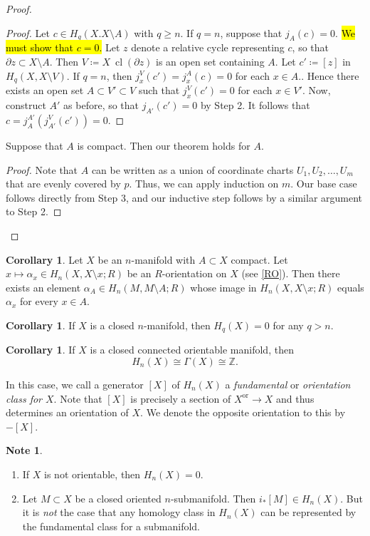 \documentclass[10pt,letterpaper,cm]{nupset}
\theoremstyle{definition}
\newtheorem{note}[definition]{Note}
\theoremstyle{theorem}
\newtheorem{corollary}[definition]{Corollary}
\theoremstyle{remark}
\newcommand{\Z}{\mathbb Z}
\newcommand{\1}{\mathbb{1}}
\newcommand{\0}{\vec 0}
\DeclareMathOperator{\cl}{cl}
\begin{document}
\begin{proof}
\begin{steps}
\begin{proof}
Let $c\in H_q(X. X\setminus A)$ with $q\geq n$. If $q=n$, suppose that $j_A(c) =0$. \hl{We must show that $c=0$.} Let $z$ denote a relative cycle representing $c$, so that $\partial{z} \subset X\setminus A$. Then $V\coloneqq  X\ \cl\left(\partial{z}\right)$ is an open set containing $A$. Let $c' \coloneqq  [z]$ in $H_q(X, X \setminus V)$.  If $q=n$, then $j_x^V(c') = j_x^A(c) =0$ for each $x\in A$.. Hence there exists an open set $A\subset V'\subset V$ such that $j_x^V(c') =0$ for each $x\in V'$.  Now, construct $A'$ as before, so that $j_{A'}(c') =0$ by Step 2. It follows that $c = j_A^{A'}(j_{A'}^V(c'))=0$.
\end{proof}
\item Suppose that $A$ is compact. Then our theorem holds for $A$. 
\begin{proof} Note that $A$ can be written as a union of coordinate charts $U_1, U_2, \ldots, U_m$ that are evenly covered by $p$. Thus, we can apply induction on $m$. Our base case follows directly from Step 3, and our inductive step follows by a similar argument to Step 2.
\end{proof}
\end{steps}
\end{proof}

\begin{corollary}
Let $X$ be an $n$-manifold with $A \subset X$ compact. Let $x \mapsto \alpha_x \in H_n(X, X \setminus x; R)$ be an $R$-orientation on $X$ (see \cref{RO}). Then there exists an element  $\alpha_A \in H_n(M, M \setminus A; R)$ whose image in $H_n(X, X \setminus x; R)$ equals $\alpha_x$ for every $x\in A$.
\end{corollary}

\begin{corollary}
If $X$ is a closed $n$-manifold, then $H_q(X) = 0$ for any $q>n$. 
\end{corollary}

\begin{corollary}
If $X$ is a closed connected  orientable manifold, then $$H_n(X) \cong \Gamma(X) \cong \Z.$$ 
\end{corollary}

In this case, we call a generator $[X]$ of $H_n(X)$ a \textit{fundamental} or \textit{orientation class for $X$}. Note that $[X]$ is precisely a section of $X^{\mathrm{or}} \to X$ and thus determines an orientation of $X$. We denote the opposite orientation to this by ${-[X]}$.

\begin{note} $ $
\begin{enumerate}
\item If $X$ is not orientable, then $H_n(X) =0$. 
\item Let $M \subset X$ be a closed oriented $n$-submanifold. Then $i_{\ast}{[M]} \in H_n(X)$. But it is \emph{not} the case that any homology class in $H_n(X)$ can be represented by the fundamental class for a submanifold.  
\end{enumerate}
\end{note}
\end{document}
